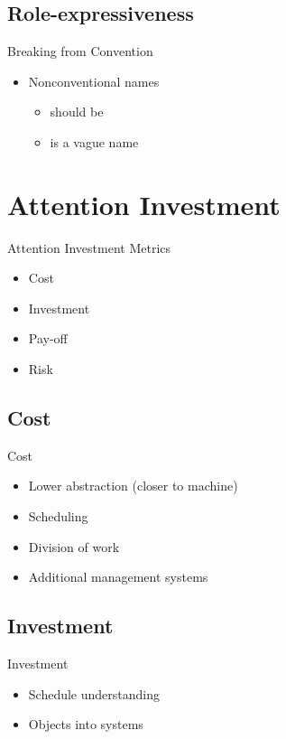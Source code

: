 \subsection{Role-expressiveness}
\begin{frame}{\secname}{\subsecname}
	Breaking from Convention
	\begin{itemize}
		\item<2-> Nonconventional names
		\begin{itemize}
			\item<3->  should be 
			\item<4->  is a vague name
		\end{itemize}
	\end{itemize}
\end{frame}

\section{Attention Investment}
\begin{frame}{\secname}{\subsecname}
	Attention Investment Metrics
	\begin{itemize}
		\item Cost
		\item Investment
		\item Pay-off
		\item Risk
	\end{itemize}
\end{frame}

\subsection{Cost}
\begin{frame}{\secname}{\subsecname}
	Cost
	\begin{itemize}
		\item<2-> Lower abstraction (closer to machine)
		\item<3-> Scheduling
		\item<4-> Division of work
		\item<5-> Additional management systems
	\end{itemize}
\end{frame}

\subsection{Investment}
\begin{frame}{\secname}{\subsecname}
	Investment
	\begin{itemize}
		\item<2-> Schedule understanding
		\item<3-> Objects into systems
	\end{itemize}
\end{frame}

